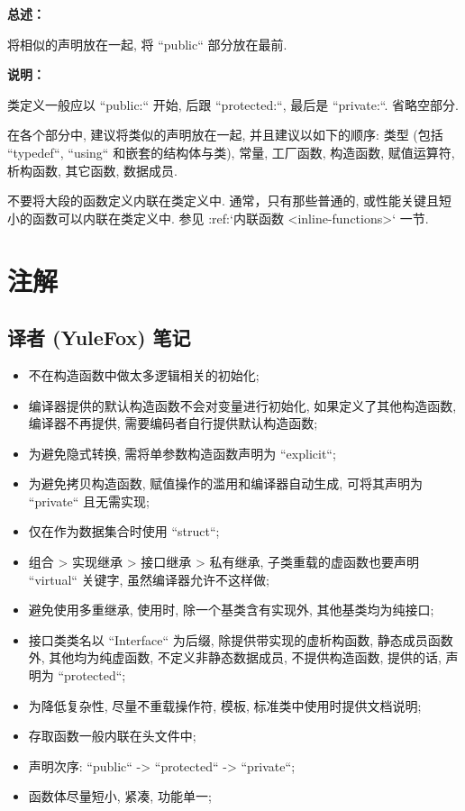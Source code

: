 \textbf{总述：}

将相似的声明放在一起, 将 ``public`` 部分放在最前.

\textbf{说明：}

类定义一般应以 ``public:`` 开始, 后跟 ``protected:``, 最后是 ``private:``. 省略空部分.

在各个部分中, 建议将类似的声明放在一起, 并且建议以如下的顺序: 类型 (包括 ``typedef``, ``using`` 和嵌套的结构体与类), 常量, 工厂函数, 构造函数, 赋值运算符, 析构函数, 其它函数, 数据成员.

不要将大段的函数定义内联在类定义中. 通常，只有那些普通的, 或性能关键且短小的函数可以内联在类定义中. 参见 :ref:`内联函数 <inline-functions>` 一节.

\section{注解}

\subsection{ 译者 (YuleFox) 笔记}

\begin{itemize}
  \item 不在构造函数中做太多逻辑相关的初始化;
  \item 编译器提供的默认构造函数不会对变量进行初始化, 如果定义了其他构造函数, 编译器不再提供, 需要编码者自行提供默认构造函数;
  \item 为避免隐式转换, 需将单参数构造函数声明为 ``explicit``;
  \item 为避免拷贝构造函数, 赋值操作的滥用和编译器自动生成, 可将其声明为 ``private`` 且无需实现;
  \item 仅在作为数据集合时使用 ``struct``;
  \item 组合 > 实现继承 > 接口继承 > 私有继承, 子类重载的虚函数也要声明 ``virtual`` 关键字, 虽然编译器允许不这样做;
  \item 避免使用多重继承, 使用时, 除一个基类含有实现外, 其他基类均为纯接口;
  \item 接口类类名以 ``Interface`` 为后缀, 除提供带实现的虚析构函数, 静态成员函数外, 其他均为纯虚函数, 不定义非静态数据成员, 不提供构造函数, 提供的话, 声明为 ``protected``;
  \item 为降低复杂性, 尽量不重载操作符, 模板, 标准类中使用时提供文档说明;
  \item 存取函数一般内联在头文件中;
  \item 声明次序: ``public`` -> ``protected`` -> ``private``;
  \item 函数体尽量短小, 紧凑, 功能单一;
\end{itemize}